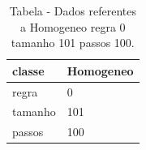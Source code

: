 \begin{table}[H]
\centering
\caption{Tabela - Dados referentes a Homogeneo regra 0 tamanho 101 passos 100.}
\label{tab:Homogeneo_regra_0_tamanho_101_passos_100}
\begin{tabular}{ll}
\toprule
classe & Homogeneo \\
\midrule
regra & 0 \\
tamanho & 101 \\
passos & 100 \\
\bottomrule
\end{tabular}

\end{table}
